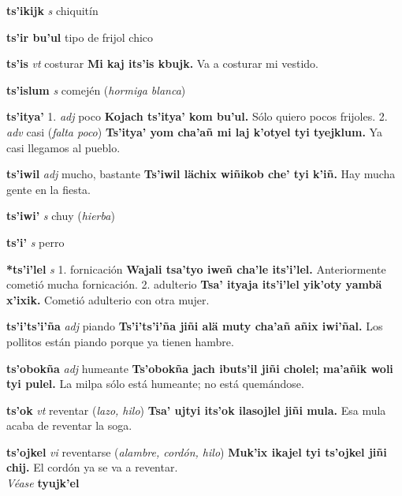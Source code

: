 \documentclass[10pt]{scrbook}
\newcommand{\entry}[1]{\textbf{#1}}
\newcommand{\onedefinition}[1]{#1.}
\newcommand{\partofspeech}[1]{\textit{#1}}
\newcommand{\spanishtranslation}[1]{#1}
\newcommand{\clarification}[1]{(\textit{#1})}
\newcommand{\cholexample}[1]{\textbf{#1}}
\newcommand{\exampletranslation}[1]{#1}
\newcommand{\alsosee}[1]{\\\textit{Véase} \textbf{#1}}
\begin{document}
\begin{multicols}{2}
\entry{ts'ikijk}
\partofspeech{s}
\spanishtranslation{chiquitín}

\entry{ts'ir bu'ul}
\spanishtranslation{tipo de frijol chico}

\entry{ts'is}
\partofspeech{vt}
\spanishtranslation{costurar}
\cholexample{Mi kaj its'is kbujk.}
\exampletranslation{Va a costurar mi vestido.}

\entry{ts'islum}
\partofspeech{s}
\spanishtranslation{comején}
\clarification{hormiga blanca}

\entry{ts'itya'}
\onedefinition{1}
\partofspeech{adj}
\spanishtranslation{poco}
\cholexample{Kojach ts'itya' kom bu'ul.}
\exampletranslation{Sólo quiero pocos frijoles.}
\onedefinition{2}
\partofspeech{adv}
\spanishtranslation{casi}
\clarification{falta poco}
\cholexample{Ts'itya' yom cha'añ mi laj k'otyel tyi tyejklum.}
\exampletranslation{Ya casi llegamos al pueblo.}

\entry{ts'iwil}
\partofspeech{adj}
\spanishtranslation{mucho, bastante}
\cholexample{Ts'iwil lächix wiñikob che' tyi k'iñ.}
\exampletranslation{Hay mucha gente en la fiesta.}

\entry{ts'iwi'}
\partofspeech{s}
\spanishtranslation{chuy}
\clarification{hierba}

\entry{ts'i'}
\partofspeech{s}
\spanishtranslation{perro}

\entry{*ts'i'lel}
\partofspeech{s}
\onedefinition{1}
\spanishtranslation{fornicación}
\cholexample{Wajali tsa'tyo iweñ cha'le its'i'lel.}
\exampletranslation{Anteriormente cometió mucha fornicación.}
\onedefinition{2}
\spanishtranslation{adulterio}
\cholexample{Tsa' ityaja its'i'lel yik'oty yambä x'ixik.}
\exampletranslation{Cometió adulterio con otra mujer.}

\entry{ts'i'ts'i'ña}
\partofspeech{adj}
\spanishtranslation{piando}
\cholexample{Ts'i'ts'i'ña jiñi alä muty cha'añ añix iwi'ñal.}
\exampletranslation{Los pollitos están piando porque ya tienen hambre.}

\entry{ts'obokña}
\partofspeech{adj}
\spanishtranslation{humeante}
\cholexample{Ts'obokña jach ibuts'il jiñi cholel; ma'añik woli tyi pulel.}
\exampletranslation{La milpa sólo está humeante; no está quemándose.}

\entry{ts'ok}
\partofspeech{vt}
\spanishtranslation{reventar}
\clarification{lazo, hilo}
\cholexample{Tsa' ujtyi its'ok ilasojlel jiñi mula.}
\exampletranslation{Esa mula acaba de reventar la soga.}

\entry{ts'ojkel}
\partofspeech{vi}
\spanishtranslation{reventarse}
\clarification{alambre, cordón, hilo}
\cholexample{Muk'ix ikajel tyi ts'ojkel jiñi chij.}
\exampletranslation{El cordón ya se va a reventar.}
\alsosee{tyujk'el}


\end{multicols}
\end{document}
